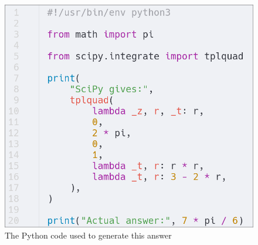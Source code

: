 \documentclass[a4paper]{article}
\begin{document}
\begin{figure}[h]
	\centering
	\includegraphics[scale=0.35]{Q3-code}
	\caption{The Python code used to generate this answer}
\end{figure}
\end{document}
